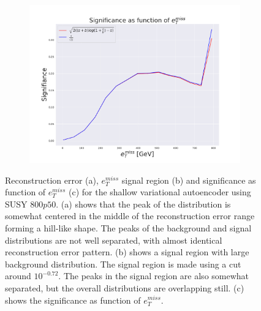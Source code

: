 \begin{figure}[!htb]
    \hfill  
    \begin{subfigure}{.49\textwidth}
        \includegraphics[width=\textwidth]{Figures/VAE_testing/small/2lep/significance_etmiss_800p0p050_-0.8542149600758421.pdf}
        \caption{}
        \label{ffig:VAE_2lep_small_signi_800}
    \end{subfigure}
    \hfill      
    \caption[2lep shallow network | $800p50$ | VAE]{Reconstruction error (a), $e_T^{miss}$ signal region (b) and significance as function of 
    $e_T^{miss}$ (c) for the shallow variational autoencoder using SUSY $800p50$. 
    (a) shows that the peak of the distribution is somewhat centered in the middle 
    of the reconstruction error range forming a hill-like shape. The peaks of the background and signal 
    distributions are not well separated, with almost identical reconstruction error pattern. (b) 
    shows a signal region with large background distribution. The signal region is made using a cut around
    $10^{-0.72}$. The peaks in the signal region are also somewhat 
    separated, but the overall distributions are overlapping still. 
    (c) shows the significance as function of $e_T^{miss}$.}
    \label{fig:VAE_2lep_small_rec_sig_signi_800}
\end{figure}


